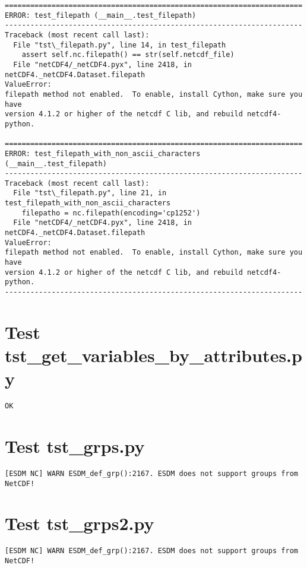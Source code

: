 \begin{verbatim}
======================================================================
ERROR: test_filepath (__main__.test_filepath)
----------------------------------------------------------------------
Traceback (most recent call last):
  File "tst\_filepath.py", line 14, in test_filepath
    assert self.nc.filepath() == str(self.netcdf_file)
  File "netCDF4/_netCDF4.pyx", line 2418, in netCDF4._netCDF4.Dataset.filepath
ValueError:
filepath method not enabled.  To enable, install Cython, make sure you have
version 4.1.2 or higher of the netcdf C lib, and rebuild netcdf4-python.

======================================================================
ERROR: test_filepath_with_non_ascii_characters (__main__.test_filepath)
----------------------------------------------------------------------
Traceback (most recent call last):
  File "tst\_filepath.py", line 21, in test_filepath_with_non_ascii_characters
    filepatho = nc.filepath(encoding='cp1252')
  File "netCDF4/_netCDF4.pyx", line 2418, in netCDF4._netCDF4.Dataset.filepath
ValueError:
filepath method not enabled.  To enable, install Cython, make sure you have
version 4.1.2 or higher of the netcdf C lib, and rebuild netcdf4-python.
----------------------------------------------------------------------

\end{verbatim}

\section{Test tst\_get\_variables\_by\_attributes.py}

\begin{verbatim}
OK
\end{verbatim}

\section{Test tst\_grps.py}

\begin{verbatim}
[ESDM NC] WARN ESDM_def_grp():2167. ESDM does not support groups from NetCDF!
\end{verbatim}

\section{Test tst\_grps2.py}

\begin{verbatim}
[ESDM NC] WARN ESDM_def_grp():2167. ESDM does not support groups from NetCDF!
\end{verbatim}

